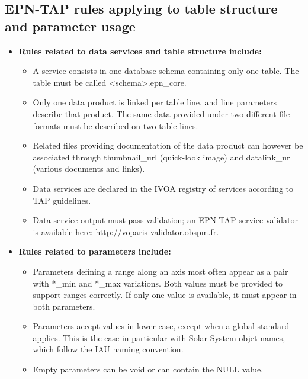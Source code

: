 \documentclass[11pt,a4paper]{ivoa}
\begin{document}
\subsection{EPN-TAP rules applying to table structure and parameter usage}


\begin{itemize}
\item \textbf{Rules related to data services and table structure include:}

\begin{itemize}
\item 
A service consists in one database schema containing only one table. The table must be called <schema>.epn\_core. 

\item Only one data product is linked per table line, and line parameters describe that product. The same data provided under two different file formats must be described on two table lines.

\item Related files providing documentation of the data product can however be associated through thumbnail\_{url} (quick-look image) and  datalink\_url (various documents and links).

\item Data services are declared in the IVOA registry of services according to TAP guidelines.

\item Data service output must pass validation; an EPN-TAP service validator is available here: http://voparis-validator.obspm.fr.
\end{itemize}


\item \textbf{Rules related to parameters include:}

\begin{itemize}
\item Parameters defining a range along an axis most often appear as a pair with *\_min and *\_max variations.
Both values must be provided to support ranges correctly. If only one value is available, it must appear in both parameters.


\item Parameters accept values in lower case, except when a global standard applies. This is the case in particular with Solar System objet names, which follow the IAU naming convention. 

\item Empty parameters can be void or can contain the NULL value. 


\end{itemize}
\end{itemize}
\end{document}
